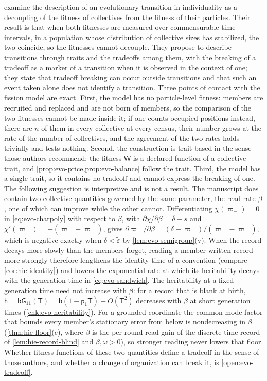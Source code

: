 \begin{remark}\label{rem:evo-bourrat-detail}
\citet{bourrat2022tradeoff} examine the description of an evolutionary transition in individuality as a decoupling of the fitness of collectives from the fitness of their particles. Their result is that when both fitnesses are measured over commensurable time intervals, in a population whose distribution of collective sizes has stabilized, the two coincide, so the fitnesses cannot decouple. They propose to describe transitions through traits and the tradeoffs among them, with the breaking of a tradeoff as a marker of a transition when it is observed in the context of one; they state that tradeoff breaking can occur outside transitions and that such an event taken alone does not identify a transition. Three points of contact with the fission model are exact. First, the model has no particle-level fitness: members are recruited and replaced and are not born of members, so the comparison of the two fitnesses cannot be made inside it; if one counts occupied positions instead, there are $n$ of them in every collective at every census, their number grows at the rate of the number of collectives, and the agreement of the two rates holds trivially and tests nothing. Second, the construction is trait-based in the sense those authors recommend: the fitness $\mathsf W$ is a declared function of a collective trait, and \cref{prop:evo-price,prop:evo-balance} follow the trait. Third, the model has a single trait, so it contains no tradeoff and cannot express the breaking of one. The following suggestion is interpretive and is not a result. The manuscript does contain two collective quantities governed by the same parameter, the read rate $\beta$, one of which can improve while the other cannot. Differentiating $\chi(\varpi_-)=0$ in \eqref{eq:evo-charpoly} with respect to $\beta$, with $\partial\chi/\partial\beta=\delta-s$ and $\chi'(\varpi_-)=-(\varpi_+-\varpi_-)$, gives $\partial\varpi_-/\partial\beta=(\delta-\varpi_-)/(\varpi_+-\varpi_-)$, which is negative exactly when $\delta<\tilde\varepsilon$ by \cref{lem:evo-semigroup}(v). When the record decays more slowly than the members forget, reading a member-written record more strongly therefore lengthens the identity time of a convention (compare \cref{cor:hie-identity}) and lowers the exponential rate at which its heritability decays with the generation time in \eqref{eq:evo-sandwich}. The heritability at a fixed generation time need not increase with $\beta$: for a record that is blank at birth, $\mathsf h=\bar{\mathsf b}\mathsf G_{11}(\mathsf T)=\bar{\mathsf b}(1-\mathsf p_1\mathsf T)+O(\mathsf T^2)$ decreases with $\beta$ at short generation times (\cref{chk:evo-heritability}). For a grounded coordinate the common-mode factor that bounds every member's stationary error from below is nondecreasing in $\beta$ (\cref{thm:hie-floor}(c), where $\beta$ is the per-round read gain of the discrete-time record of \cref{lem:hie-record-blind} and $\beta,\omega>0$), so stronger reading never lowers that floor. Whether fitness functions of these two quantities define a tradeoff in the sense of those authors, and whether a change of organization can break it, is \cref{open:evo-tradeoff}.
\end{remark}
